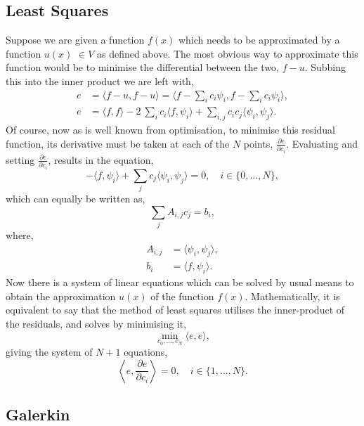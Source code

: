 \subsection{Least Squares}
Suppose we are given a function $f(x)$ which needs to be approximated by a function $u(x)$ $\in V$ as defined above. The most obvious way to approximate this function would be to minimise the differential between the two, $f-u$. Subbing this into the inner product we are left with,
\begin{align}
	e &= \langle f-u, f-u\rangle = \langle f-\sum_i c_i \psi_i,f-\sum_i c_i \psi_i\rangle,\\
	e &= \langle f,f\rangle - 2~\sum_i c_i\langle f,\psi_i\rangle + \sum_{i,j} c_i c_j \langle\psi_i, \psi_j\rangle. 
\end{align}
Of course, now as is well known from optimisation, to minimise this residual function, its derivative must be taken at each of the $N$ points, $\frac{\partial e}{\partial c_i}$. Evaluating and setting $\frac{\partial e}{\partial c_i}$, results in the equation,
\begin{equation}
	- \langle f,\psi_i\rangle + \sum_j c_j\langle \psi_i, \psi_j\rangle = 0,\quad i \in \{0,\dots,N\},
\end{equation}
which can equally be written as,
\begin{equation}
	\sum_j A_{i,j}c_j = b_i,
\end{equation}
where,
\begin{align}
	A_{i,j} &= \langle \psi_i, \psi_j\rangle,\\
	b_i &= \langle f, \psi_i \rangle.
\end{align}
Now there is a system of linear equations which can be solved by usual means to obtain the approximation $u(x)$ of the function $f(x)$. Mathematically, it is equivalent to say that the method of least squares utilises the inner-product of the residuals, and solves by minimising it,
\begin{equation}
	\min_{c_0,\dots,c_N} \langle e, e\rangle,
\end{equation}
giving the system of $N+1$ equations,
\begin{equation}
	\left\langle e, \frac{\partial e}{\partial c_i}\right\rangle = 0, \quad i\in\{1,\dots,N\}.
\end{equation}

\subsection{Galerkin}

